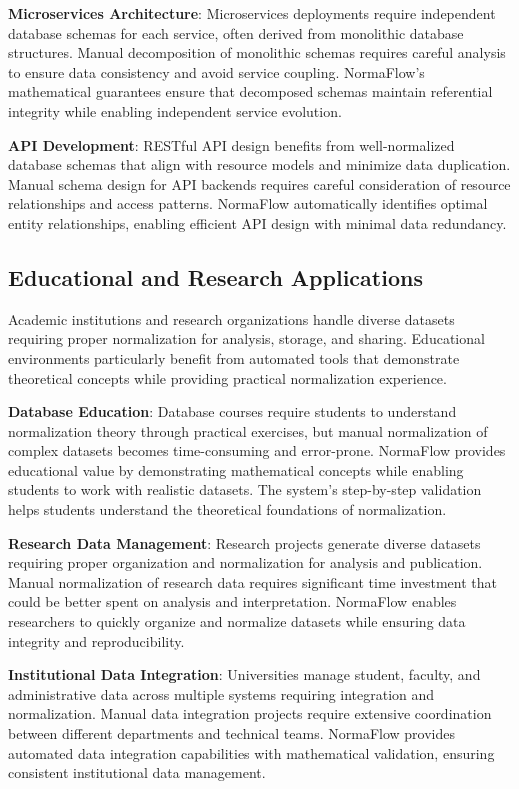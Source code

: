 \documentclass[acmsmall]{acmart}
\newcommand{\parab}[1]{\vspace{0.05in}\noindent\textbf{#1}}
\begin{document}
\parab{Microservices Architecture}: Microservices deployments require independent database schemas for each service, often derived from monolithic database structures. Manual decomposition of monolithic schemas requires careful analysis to ensure data consistency and avoid service coupling. NormaFlow's mathematical guarantees ensure that decomposed schemas maintain referential integrity while enabling independent service evolution.

\parab{API Development}: RESTful API design benefits from well-normalized database schemas that align with resource models and minimize data duplication. Manual schema design for API backends requires careful consideration of resource relationships and access patterns. NormaFlow automatically identifies optimal entity relationships, enabling efficient API design with minimal data redundancy.

\subsection{Educational and Research Applications}

Academic institutions and research organizations handle diverse datasets requiring proper normalization for analysis, storage, and sharing. Educational environments particularly benefit from automated tools that demonstrate theoretical concepts while providing practical normalization experience.

\parab{Database Education}: Database courses require students to understand normalization theory through practical exercises, but manual normalization of complex datasets becomes time-consuming and error-prone. NormaFlow provides educational value by demonstrating mathematical concepts while enabling students to work with realistic datasets. The system's step-by-step validation helps students understand the theoretical foundations of normalization.

\parab{Research Data Management}: Research projects generate diverse datasets requiring proper organization and normalization for analysis and publication. Manual normalization of research data requires significant time investment that could be better spent on analysis and interpretation. NormaFlow enables researchers to quickly organize and normalize datasets while ensuring data integrity and reproducibility.

\parab{Institutional Data Integration}: Universities manage student, faculty, and administrative data across multiple systems requiring integration and normalization. Manual data integration projects require extensive coordination between different departments and technical teams. NormaFlow provides automated data integration capabilities with mathematical validation, ensuring consistent institutional data management.
\end{document}
